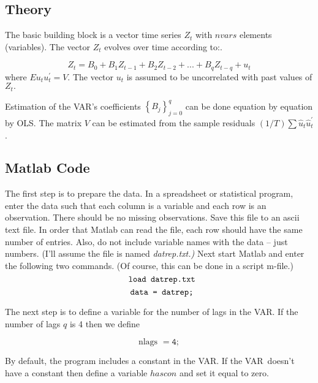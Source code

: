 \documentclass{article}
\begin{document}
\subsection{Theory}

The basic building block is a vector time series $Z_{t}$ with $nvars$
elements (variables). The vector $Z_{t}$ evolves over time according to:.

\begin{equation*}
Z_{t}=B_{0}+B_{1}Z_{t-1}+B_{2}Z_{t-2}+...+B_{q}Z_{t-q}+u_{t}
\end{equation*}
where $Eu_{t}u_{t}^{\prime }=V.$ The vector $u_{t}$ is assumed to be
uncorrelated with past values of $Z_{t}.$

Estimation of the VAR's coefficients $\left\{ B_{j}\right\} _{j=0}^{q}$ can
be done equation by equation by OLS. The matrix $V$ can be estimated from
the sample residuals $\left( 1/T\right) \sum \hat{u}_{t}\hat{u}_{t}^{\prime
} $.

\subsection{Matlab Code}

The first step is to prepare the data. In a spreadsheet or statistical
program, enter the data such that each column is a variable and each row is
an observation. There should be no missing observations. Save this file to
an ascii text file. In order that Matlab can read the file, each row should
have the same number of entries. Also, do not include variable names with
the data -- just numbers. (I'll assume the file is named \emph{datrep.txt.) }%
Next start Matlab and enter the following two commands. (Of course, this can
be done in a script m-file.) 
\begin{equation*}
\text{\texttt{load datrep.txt}}
\end{equation*}
\begin{equation*}
\text{\texttt{data = datrep;}}
\end{equation*}

The next step is to define a variable for the number of lags in the VAR. If
the number of lags $q$ is 4 then we define

\begin{equation*}
\text{nlags \ }\mathtt{=4;}
\end{equation*}

By default, the program includes a constant in the VAR. If the VAR\ doesn't
have a constant then define a variable $hascon$ and set it equal to zero.
\end{document}
